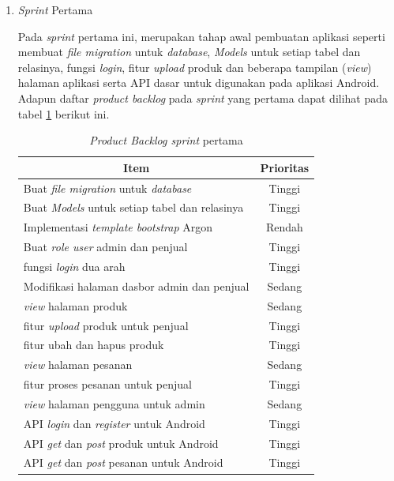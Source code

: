 \begin{enumerate}
	\item \textit{Sprint} Pertama
	\par Pada \textit{sprint} pertama ini, merupakan tahap awal pembuatan aplikasi seperti membuat \textit{file migration} untuk \textit{database}, \textit{Models} untuk setiap tabel dan relasinya, fungsi \textit{login}, fitur \textit{upload} produk dan beberapa tampilan (\textit{view}) halaman aplikasi serta API dasar untuk digunakan pada aplikasi Android. Adapun daftar \textit{product backlog} pada \textit{sprint} yang pertama dapat dilihat pada tabel \ref*{tab:sprint pertama} berikut ini.


	\addtocounter{table}{+1}
	\begin{table}[H]
		\begin{center}
		\caption{\textit{Product Backlog sprint} pertama}
		\label{tab:sprint pertama}
		\begin{tabular}{|l|c|}
		\hline
		\multicolumn{1}{|c|}{Item} & Prioritas\\
		\hline
		Buat \textit{file migration} untuk \textit{database} & Tinggi\\
		\hline
		Buat \textit{Models} untuk setiap tabel dan relasinya & Tinggi\\
		\hline
		Implementasi \textit{template bootstrap} Argon & Rendah\\
		\hline
		Buat \textit{role user} admin dan penjual & Tinggi\\
		\hline
		fungsi \textit{login} dua arah & Tinggi\\
		\hline
		Modifikasi halaman dasbor admin dan penjual & Sedang\\
		\hline
		\textit{view} halaman produk & Sedang\\
		\hline
		fitur \textit{upload} produk untuk penjual& Tinggi\\
		\hline
		fitur ubah dan hapus produk & Tinggi\\
		\hline
		\textit{view} halaman pesanan & Sedang\\
		\hline
		fitur proses pesanan untuk penjual & Tinggi\\
		\hline
		\textit{view} halaman pengguna untuk admin & Sedang\\
		\hline
		API \textit{login} dan \textit{register} untuk Android & Tinggi\\
		\hline
		API \textit{get} dan \textit{post} produk untuk Android & Tinggi\\
		\hline
		API \textit{get} dan \textit{post} pesanan untuk Android & Tinggi\\
		\hline
		\end{tabular}
		\end{center}
	\end{table}


\end{enumerate}
